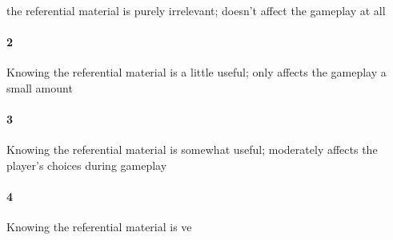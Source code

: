  the referential material is purely irrelevant; doesn't affect the gameplay at all\paragraph{2}Knowing the referential material is a little useful; only affects the gameplay a small amount\paragraph{3}Knowing the referential material is somewhat useful; moderately affects the player's choices during gameplay\paragraph{4}Knowing the referential material is ve